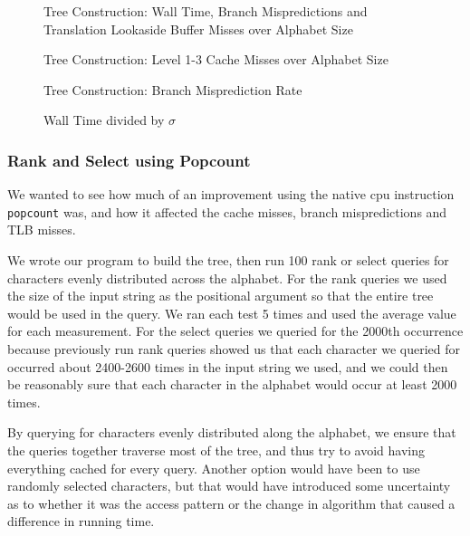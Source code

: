 \begin{figure}
	
	\caption{Tree Construction: Wall Time, Branch Mispredictions and Translation Lookaside Buffer Misses over Alphabet Size}
	\label{fig:naiveIntegerAlphabetSize_WallTime_BM_TLB}
\end{figure}

\begin{figure}

\caption{Tree Construction: Level 1-3 Cache Misses over Alphabet Size}
\label{fig:naiveIntegerAlphabetSize_CM}
\end{figure}
	
\begin{figure}

\caption{Tree Construction: Branch Misprediction Rate}
\label{fig:naiveIntegerAlphabetSize_BMRate}
\end{figure}
	

\begin{figure}

\caption{Wall Time divided by $\sigma$}
\label{fig:naiveIntegerAlphabetSize_WallTime_plusSigma}
\end{figure}




\subsubsection{Rank and Select using Popcount}
\label{sec:experimentPopcountRankSelect}
We wanted to see how much of an improvement using the native cpu instruction \texttt{popcount} was, and how it affected the cache misses, branch mispredictions and TLB misses.

We wrote our program to build the tree, then run 100 rank or select queries for characters evenly distributed across the alphabet.
For the rank queries we used the size of the input string as the positional argument so that the entire tree would be used in the query.
We ran each test 5 times and used the average value for each measurement.
For the select queries we queried for the 2000th occurrence because previously run rank queries showed us that each character we queried for occurred about 2400-2600 times in the input string we used, and we could then be reasonably sure that each character in the alphabet would occur at least 2000 times.

By querying for characters evenly distributed along the alphabet, we ensure that the queries together traverse most of the tree, and thus try to avoid having everything cached for every query. Another option would have been to use randomly selected characters, but that would have introduced some uncertainty as to whether it was the access pattern or the change in algorithm that caused a difference in running time.



